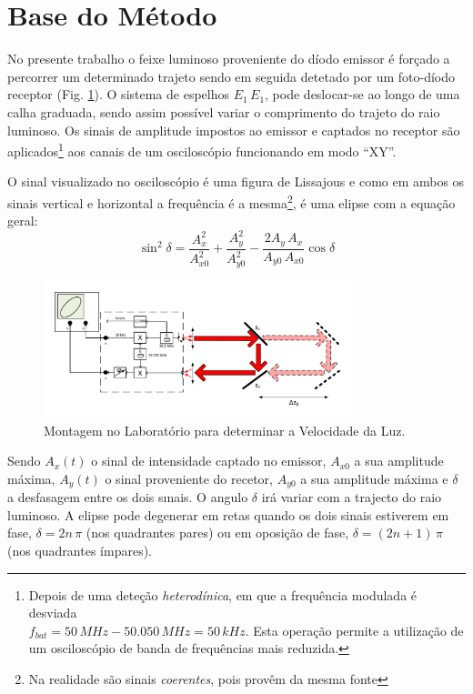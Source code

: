 \documentclass[a4paper,12pt]{article}      %
\begin{document}

\section{\sf Base do Método}
No presente trabalho o feixe luminoso proveniente do díodo emissor
é forçado a percorrer um determinado trajeto sendo em seguida detetado
por um foto-díodo receptor (Fig. \ref{fig:Montagem}). O sistema de espelhos $E_1\,E_1$, pode deslocar-se ao longo de uma calha graduada,
sendo assim possível variar o comprimento do trajeto do raio luminoso. Os
sinais de amplitude impostos ao emissor e captados no receptor são aplicados\footnote{Depois de uma deteção \emph{heterodínica}, em que a frequência modulada é desviada \\ 
$f_{bat}=50\, MHz -50.050\, MHz = 50\,kHz$. Esta operação permite a utilização de um osciloscópio de banda de frequências mais reduzida.} 
aos canais de um osciloscópio funcionando em modo “XY”.

O sinal visualizado no osciloscópio é uma figura de Lissajous e como em ambos os sinais vertical e horizontal a frequência é a 
mesma\footnote{Na realidade são sinais \emph{coerentes}, pois provêm da mesma fonte}, é uma elipse com a equação geral:
\begin{equation}
	\label{eq:elipse}
	\sin^2 \delta = \frac{A_x^2}{A_{x0}^2} + \frac{A_y^2}{A_{y0}^2} - \frac{2 A_y\,A_x}{A_{y0}\,A_{x0}} \cos  \delta
\end{equation}

\begin{figure}
	[htb]  \centering 
	\includegraphics[width=0.8\textwidth]{Vel_esquema}
	\caption{Montagem no Laboratório para determinar a Velocidade da Luz. \label{fig:Montagem}} 
\end{figure}

Sendo $A_x(t)$ o sinal de intensidade captado no emissor,  $A_{x0}$ a sua amplitude máxima,  $A_y(t)$ o sinal
proveniente do recetor, $A_{y0}$ a sua amplitude máxima e $\delta$ a desfasagem entre os dois
sınais. O angulo $\delta$ irá variar com a trajecto do raio luminoso.  A elipse pode degenerar em retas quando os dois sinais estiverem
em fase, $\delta = 2n\,\pi$ (nos quadrantes pares)  ou em oposição de fase, $\delta = (2n+1)\,\pi$ (nos quadrantes ímpares). 
\end{document}
